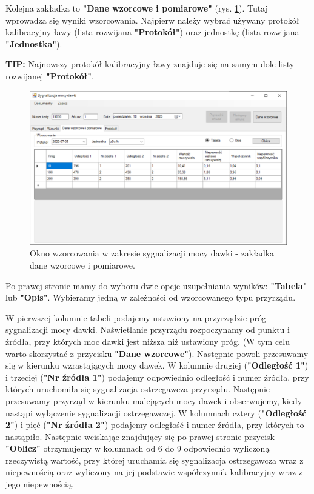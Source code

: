 	Kolejna zakładka to \textbf{"Dane wzorcowe i pomiarowe"} (rys. \ref{sygMocyDane}). Tutaj wprowadza się wyniki wzorcowania. Najpierw należy wybrać używany protokół kalibracyjny ławy (lista rozwijana \textbf{"Protokół"}) oraz jednostkę (lista rozwijana \textbf{"Jednostka"}).
	
	\textbf{TIP:} Najnowszy protokół kalibracyjny ławy znajduje się na samym dole listy rozwijanej \textbf{"Protokół"}.
	
	\begin{figure}[htb]
		\centering
		\includegraphics[width=\columnwidth]{obrazki/Wzorcowanie/syg_mocy_dawki/dane.png}
		\caption{Okno wzorcowania w zakresie sygnalizacji mocy dawki - zakładka dane wzorcowe i pomiarowe.}
		\label{sygMocyDane}
	\end{figure}
	


	Po prawej stronie mamy do wyboru dwie opcje uzupełniania wyników: \textbf{"Tabela"} lub \textbf{"Opis"}. Wybieramy jedną w zależności od wzorcowanego typu przyrządu. 
		
	W pierwszej kolumnie tabeli podajemy ustawiony na przyrządzie próg sygnalizacji mocy dawki. Naświetlanie przyrządu rozpoczynamy od punktu i źródła, przy których moc dawki jest niższa niż ustawiony próg. (W tym celu warto skorzystać z przycisku \textbf{"Dane wzorcowe"}). Następnie powoli przesuwamy się w kierunku wzrastających mocy dawek. W kolumnie drugiej (\textbf{"Odległość 1"}) i trzeciej (\textbf{"Nr źródła 1"}) podajemy odpowiednio odległość i numer źródła, przy których uruchomiła się sygnalizacja ostrzegawcza przyrządu. Następnie przesuwamy przyrząd w kierunku malejących mocy dawek i obserwujemy, kiedy nastąpi wyłączenie sygnalizacji ostrzegawczej. W kolumnach cztery (\textbf{"Odległość 2"}) i pięć (\textbf{"Nr źródła 2"}) podajemy odległość i numer źródła, przy których to nastąpiło. Następnie wciskając znajdujący się po prawej stronie przycisk \textbf{"Oblicz"} otrzymujemy w kolumnach od 6 do 9 odpowiednio wyliczoną rzeczywistą wartość, przy której uruchamia się sygnalizacja ostrzegawcza wraz z niepewnością oraz wyliczony na jej podstawie współczynnik kalibracyjny wraz z jego niepewnością.
	
